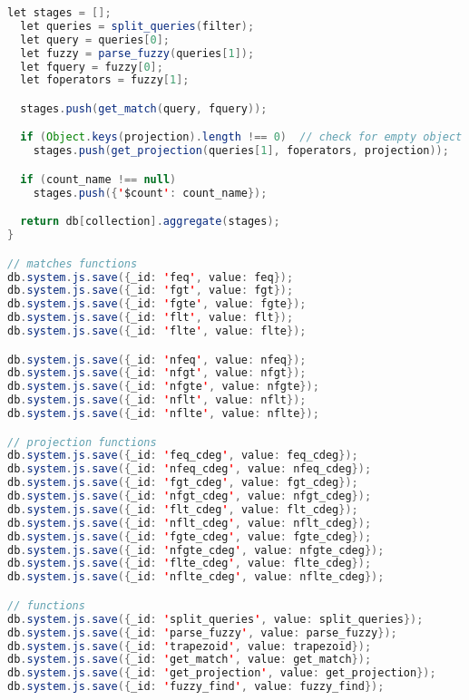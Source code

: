 \begin{lstlisting}[language=java, escapechar=|]
  let stages = [];
  let queries = split_queries(filter);
  let query = queries[0];
  let fuzzy = parse_fuzzy(queries[1]);
  let fquery = fuzzy[0];
  let foperators = fuzzy[1];

  stages.push(get_match(query, fquery));

  if (Object.keys(projection).length !== 0)  // check for empty object
    stages.push(get_projection(queries[1], foperators, projection));

  if (count_name !== null)
    stages.push({'$count': count_name});

  return db[collection].aggregate(stages);
}

// matches functions
db.system.js.save({_id: 'feq', value: feq});
db.system.js.save({_id: 'fgt', value: fgt});
db.system.js.save({_id: 'fgte', value: fgte});
db.system.js.save({_id: 'flt', value: flt});
db.system.js.save({_id: 'flte', value: flte});

db.system.js.save({_id: 'nfeq', value: nfeq});
db.system.js.save({_id: 'nfgt', value: nfgt});
db.system.js.save({_id: 'nfgte', value: nfgte});
db.system.js.save({_id: 'nflt', value: nflt});
db.system.js.save({_id: 'nflte', value: nflte});

// projection functions
db.system.js.save({_id: 'feq_cdeg', value: feq_cdeg});
db.system.js.save({_id: 'nfeq_cdeg', value: nfeq_cdeg});
db.system.js.save({_id: 'fgt_cdeg', value: fgt_cdeg});
db.system.js.save({_id: 'nfgt_cdeg', value: nfgt_cdeg});
db.system.js.save({_id: 'flt_cdeg', value: flt_cdeg});
db.system.js.save({_id: 'nflt_cdeg', value: nflt_cdeg});
db.system.js.save({_id: 'fgte_cdeg', value: fgte_cdeg});
db.system.js.save({_id: 'nfgte_cdeg', value: nfgte_cdeg});
db.system.js.save({_id: 'flte_cdeg', value: flte_cdeg});
db.system.js.save({_id: 'nflte_cdeg', value: nflte_cdeg});

// functions
db.system.js.save({_id: 'split_queries', value: split_queries});
db.system.js.save({_id: 'parse_fuzzy', value: parse_fuzzy});
db.system.js.save({_id: 'trapezoid', value: trapezoid});
db.system.js.save({_id: 'get_match', value: get_match});
db.system.js.save({_id: 'get_projection', value: get_projection});
db.system.js.save({_id: 'fuzzy_find', value: fuzzy_find});
\end{lstlisting}